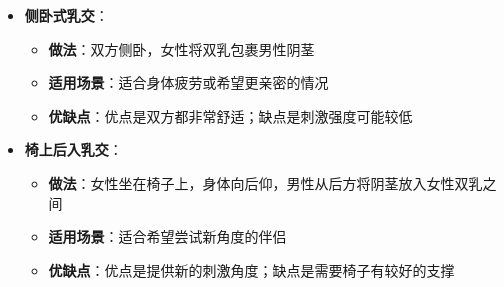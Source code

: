 \documentclass[12pt,UTF8]{ctexbook}
\begin{document}
\begin{itemize}
	\item \textbf{侧卧式乳交}：
	\begin{itemize}
		\item \textbf{做法}：双方侧卧，女性将双乳包裹男性阴茎
		\item \textbf{适用场景}：适合身体疲劳或希望更亲密的情况
		\item \textbf{优缺点}：优点是双方都非常舒适；缺点是刺激强度可能较低
	\end{itemize}
	\item \textbf{椅上后入乳交}：
	\begin{itemize}
		\item \textbf{做法}：女性坐在椅子上，身体向后仰，男性从后方将阴茎放入女性双乳之间
		\item \textbf{适用场景}：适合希望尝试新角度的伴侣
		\item \textbf{优缺点}：优点是提供新的刺激角度；缺点是需要椅子有较好的支撑
	\end{itemize}
\end{itemize}
\end{document}
